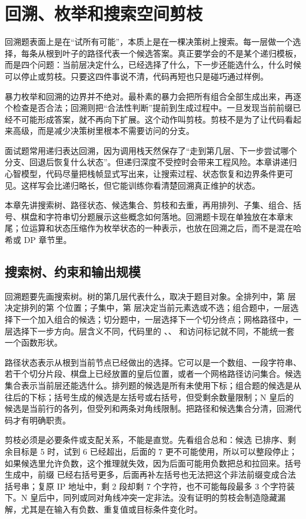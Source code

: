 \chapter{回溯、枚举和搜索空间剪枝}

回溯题表面上是在“试所有可能”，本质上是在一棵决策树上搜索。每一层做一个选择，每条从根到叶子的路径代表一个候选答案。真正要学会的不是某个递归模板，而是四个问题：当前层决定什么，已经选择了什么，下一步还能选什么，什么时候可以停止或剪枝。只要这四件事说不清，代码再短也只是碰巧通过样例。

暴力枚举和回溯的边界并不绝对。最朴素的暴力会把所有组合全部生成出来，再逐个检查是否合法；回溯则把“合法性判断”提前到生成过程中。一旦发现当前前缀已经不可能形成答案，就不再向下扩展。这个动作叫剪枝。剪枝不是为了让代码看起来高级，而是减少决策树里根本不需要访问的分支。

\cpp 面试题常用递归表达回溯，因为调用栈天然保存了“走到第几层、下一步尝试哪个分支、回退后恢复什么状态”。但递归深度不受控时会带来工程风险。本章讲递归心智模型，代码尽量把栈帧显式写出来，让搜索过程、状态恢复和边界条件更可见。这样写会比递归略长，但它能训练你看清楚回溯真正维护的状态。

本章先讲搜索树、路径状态、候选集合、剪枝和去重，再用排列、子集、组合、括号、棋盘和字符串切分题展示这些概念如何落地。回溯题卡现在单独放在本章末尾；位运算和状态压缩作为枚举状态的一种表示，也放在回溯之后，而不是混在哈希或 DP 章节里。

\section{搜索树、约束和输出规模}

回溯题要先画搜索树。树的第几层代表什么，取决于题目对象。全排列中，第  层决定排列的第  个位置；子集中，第  层决定当前元素选或不选；组合题中，一层选择下一个加入组合的候选；切分题中，一层选择下一个切分终点；网格路径中，一层选择下一步方向。层含义不同，代码里的 、、 和访问标记就不同，不能统一套一个函数形状。

路径状态表示从根到当前节点已经做出的选择。它可以是一个数组、一段字符串、若干个切分片段、棋盘上已经放置的皇后位置，或者一个网格路径访问集合。候选集合表示当前层还能选什么。排列题的候选是所有未使用下标；组合题的候选是从  往后的下标；括号生成的候选是左括号或右括号，但受剩余数量限制；N 皇后的候选是当前行的各列，但受列和两条对角线限制。把路径和候选集合分清，回溯代码才有明确职责。

剪枝必须是必要条件或支配关系，不能是直觉。先看组合总和：候选 \code{[2,3,6,7]} 已排序、剩余目标是 5 时，试到 6 已经超出，后面的 7 更不可能使用，所以可以整段停止；如果候选里允许负数，这个推理就失效，因为后面可能用负数把总和拉回来。括号生成中，前缀  已经右括号更多，后面再补左括号也无法把这个非法前缀变成合法括号串；复原 IP 地址中，剩 2 段却剩 7 个字符，也不可能每段最多 3 个字符装下。N 皇后中，同列或同对角线冲突一定非法。没有证明的剪枝会制造隐藏漏解，尤其是在输入有负数、重复值或目标条件变化时。

